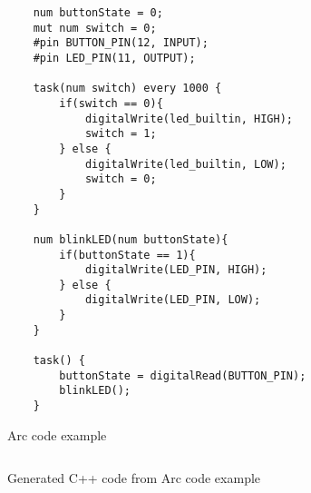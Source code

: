 

\begin{listing}[htb!]
    \begin{verbatim}
    num buttonState = 0;
    mut num switch = 0;
    #pin BUTTON_PIN(12, INPUT);
    #pin LED_PIN(11, OUTPUT);

    task(num switch) every 1000 {
        if(switch == 0){
            digitalWrite(led_builtin, HIGH);
            switch = 1;
        } else {
            digitalWrite(led_builtin, LOW);
            switch = 0;
        }
    }

    num blinkLED(num buttonState){
        if(buttonState == 1){
            digitalWrite(LED_PIN, HIGH);
        } else {
            digitalWrite(LED_PIN, LOW);
        }
    }

    task() {
        buttonState = digitalRead(BUTTON_PIN);
        blinkLED();
    }
    \end{verbatim}
    \caption{Arc code example}
    \label{lst:arc code example}
\end{listing}


\begin{listing}[htb!]
    \begin{verbatim}

    \end{verbatim}
    \caption{Generated C++ code from Arc code example}
    \label{lst:generated C++ code from Arc code example}
\end{listing}